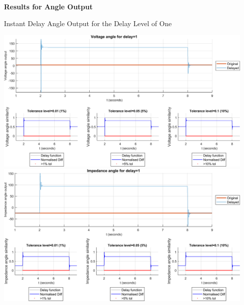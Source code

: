\newpage \textbf{Results for Angle Output}
\begin{floatingfigure}[p]{\textwidth}
    \caption{Instant Delay Angle Output for the Delay Level of One}
    \includegraphics[width=0.95\textwidth]{PMUsim-figures/DelayOf_1/Instant_vAngle.png}    
    \includegraphics[width=0.95\textwidth]{PMUsim-figures/DelayOf_1/Instant_iAngle.png}    
      \label{fig:PMUsim_One_Angle}
\end{floatingfigure}
      \begin{small}
     \end{small}

